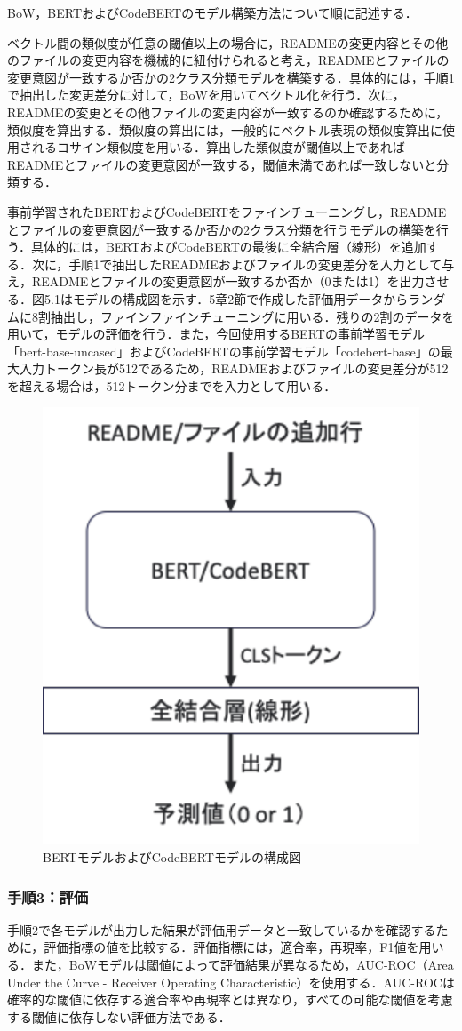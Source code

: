 \documentclass[submit]{ipsj}
\begin{document}
BoW，BERTおよびCodeBERTのモデル構築方法について順に記述する．

ベクトル間の類似度が任意の閾値以上の場合に，READMEの変更内容とその他のファイルの変更内容を機械的に紐付けられると考え，READMEとファイルの変更意図が一致するか否かの2クラス分類モデルを構築する．具体的には，手順1で抽出した変更差分に対して，BoWを用いてベクトル化を行う．次に，READMEの変更とその他ファイルの変更内容が一致するのか確認するために，類似度を算出する．類似度の算出には，一般的にベクトル表現の類似度算出に使用されるコサイン類似度を用いる．算出した類似度が閾値以上であればREADMEとファイルの変更意図が一致する，閾値未満であれば一致しないと分類する．

事前学習されたBERTおよびCodeBERTをファインチューニングし，READMEとファイルの変更意図が一致するか否かの2クラス分類を行うモデルの構築を行う．具体的には，BERTおよびCodeBERTの最後に全結合層（線形）を追加する．次に，手順1で抽出したREADMEおよびファイルの変更差分を入力として与え，READMEとファイルの変更意図が一致するか否か（0または1）を出力させる．図5.1はモデルの構成図を示す．5章2節で作成した評価用データからランダムに8割抽出し，ファインファインチューニングに用いる．残りの2割のデータを用いて，モデルの評価を行う．また，今回使用するBERTの事前学習モデル「bert-base-uncased」およびCodeBERTの事前学習モデル「codebert-base」の最大入力トークン長が512であるため，READMEおよびファイルの変更差分が512を超える場合は，512トークン分までを入力として用いる．

\begin{figure}[t]
 	\centering
		\includegraphics[width=0.4\linewidth]{./IPSJ202303_Ishioka/BERT_flow.pdf}
	\caption{BERTモデルおよびCodeBERTモデルの構成図}
	\label{fig:oss_developments}
\end{figure}

\subsubsection{手順3：評価}
手順2で各モデルが出力した結果が評価用データと一致しているかを確認するために，評価指標の値を比較する．評価指標には，適合率，再現率，F1値を用いる．また，BoWモデルは閾値によって評価結果が異なるため，AUC-ROC（Area Under the Curve - Receiver Operating Characteristic）を使用する．AUC-ROCは確率的な閾値に依存する適合率や再現率とは異なり，すべての可能な閾値を考慮する閾値に依存しない評価方法である．
\end{document}
